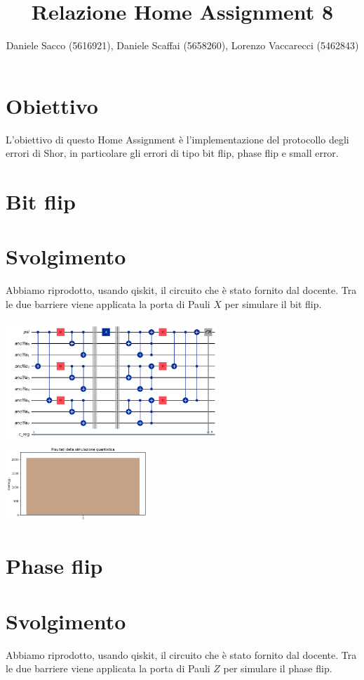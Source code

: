 \documentclass[12pt, a4paper]{article}
\title{Relazione Home Assignment 8}
\author{Daniele Sacco (5616921), Daniele Scaffai (5658260), Lorenzo Vaccarecci (5462843)}
\date{}
\begin{document}
\maketitle
\section*{Obiettivo}
L'obiettivo di questo Home Assignment è l'implementazione del protocollo degli errori di Shor, in particolare gli errori di tipo bit flip, phase flip e small error.

\section*{Bit flip}
\section*{Svolgimento}
Abbiamo riprodotto, usando qiskit, il circuito che è stato fornito dal docente. Tra le due barriere viene applicata la porta di Pauli $X$ per simulare il bit flip.
   
\begin{center} 
        \includegraphics[width=0.6\textwidth]{img/circuit.png} 
        \includegraphics[width=0.4\textwidth]{img/resultsSuccess.png}
\end{center}

\section*{Phase flip}
\section*{Svolgimento}
Abbiamo riprodotto, usando qiskit, il circuito che è stato fornito dal docente. Tra le due barriere viene applicata la porta di Pauli $Z$ per simulare il phase flip.
   
\end{document}
